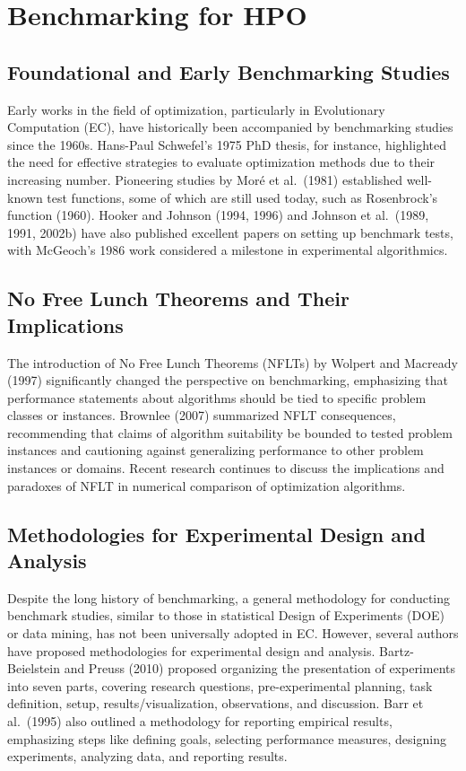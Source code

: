 \section{Benchmarking for HPO}

\subsection{Foundational and Early Benchmarking Studies}

Early works in the field of optimization, particularly in Evolutionary Computation (EC), have historically been accompanied by benchmarking studies since the 1960s. Hans-Paul Schwefel's 1975 PhD thesis, for instance, highlighted the need for effective strategies to evaluate optimization methods due to their increasing number. Pioneering studies by Mor\'e et al.\ (1981) established well-known test functions, some of which are still used today, such as Rosenbrock's function (1960). Hooker and Johnson (1994, 1996) and Johnson et al.\ (1989, 1991, 2002b) have also published excellent papers on setting up benchmark tests, with McGeoch's 1986 work considered a milestone in experimental algorithmics.

\subsection{No Free Lunch Theorems and Their Implications}

The introduction of No Free Lunch Theorems (NFLTs) by Wolpert and Macready (1997) significantly changed the perspective on benchmarking, emphasizing that performance statements about algorithms should be tied to specific problem classes or instances. Brownlee (2007) summarized NFLT consequences, recommending that claims of algorithm suitability be bounded to tested problem instances and cautioning against generalizing performance to other problem instances or domains. Recent research continues to discuss the implications and paradoxes of NFLT in numerical comparison of optimization algorithms.

\subsection{Methodologies for Experimental Design and Analysis}

Despite the long history of benchmarking, a general methodology for conducting benchmark studies, similar to those in statistical Design of Experiments (DOE) or data mining, has not been universally adopted in EC. However, several authors have proposed methodologies for experimental design and analysis. Bartz-Beielstein and Preuss (2010) proposed organizing the presentation of experiments into seven parts, covering research questions, pre-experimental planning, task definition, setup, results/visualization, observations, and discussion. Barr et al.\ (1995) also outlined a methodology for reporting empirical results, emphasizing steps like defining goals, selecting performance measures, designing experiments, analyzing data, and reporting results.

